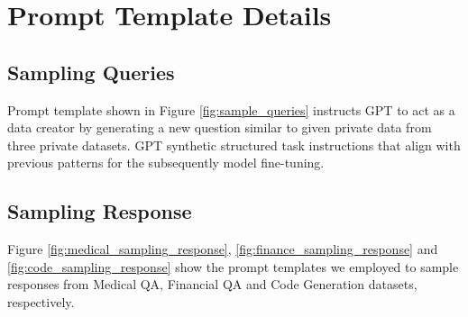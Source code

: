 \section{Prompt Template Details}
\label{prompt_template_details}

\subsection{Sampling Queries}
\label{sec:sampling_queries}
Prompt template shown in Figure \ref{fig:sample_queries} instructs GPT to act as a data creator by generating a new question similar to given private data from three private datasets.
GPT synthetic structured task instructions that align with previous patterns for the subsequently model fine-tuning.

\subsection{Sampling Response}
\label{sec:sampling_response}
Figure \ref{fig:medical_sampling_response}, \ref{fig:finance_sampling_response} and \ref{fig:code_sampling_response} show the prompt templates we employed to sample responses from Medical QA, Financial QA and Code Generation datasets, respectively.

